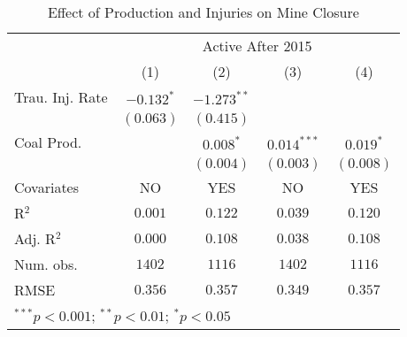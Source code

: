 
\begin{table}[H]
\begin{center}
\begin{tabular}{l c c c c}
\hline
 & \multicolumn{4}{c}{Active After 2015} \\
\cline{2-5}
 & (1) & (2) & (3) & (4) \\
\hline
Trau. Inj. Rate & $-0.132^{*}$ & $-1.273^{**}$ &               &             \\
                & $(0.063)$    & $(0.415)$     &               &             \\
Coal Prod.      &              & $0.008^{*}$   & $0.014^{***}$ & $0.019^{*}$ \\
                &              & $(0.004)$     & $(0.003)$     & $(0.008)$   \\
\hline
Covariates      & NO           & YES           & NO            & YES         \\
R$^2$           & $0.001$      & $0.122$       & $0.039$       & $0.120$     \\
Adj. R$^2$      & $0.000$      & $0.108$       & $0.038$       & $0.108$     \\
Num. obs.       & $1402$       & $1116$        & $1402$        & $1116$      \\
RMSE            & $0.356$      & $0.357$       & $0.349$       & $0.357$     \\
\hline
\multicolumn{5}{l}{\scriptsize{$^{***}p<0.001$; $^{**}p<0.01$; $^{*}p<0.05$}}
\end{tabular}
\caption{Effect of Production and Injuries on Mine Closure}
\label{closure_linprob}
\end{center}
\end{table}

